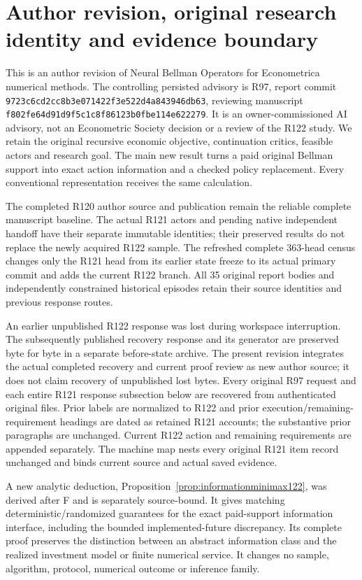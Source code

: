 \section*{Author revision, original research identity and evidence boundary}
This is an author revision of Neural Bellman Operators for Econometrica numerical methods. The controlling persisted advisory is R97, report commit \nolinkurl{9723c6cd2cc8b3e071422f3e522d4a843946db63}, reviewing manuscript \nolinkurl{f802fe64d91d9f5c1c8f86123b0fbe114e622279}. It is an owner-commissioned AI advisory, not an Econometric Society decision or a review of the R122 study. We retain the original recursive economic objective, continuation critics, feasible actors and research goal. The main new result turns a paid original Bellman support into exact action information and a checked policy replacement. Every conventional representation receives the same calculation.

The completed R120 author source and publication remain the reliable complete manuscript baseline. The actual R121 actors and pending native independent handoff have their separate immutable identities; their preserved results do not replace the newly acquired R122 sample. The refreshed complete 363-head census changes only the R121 head from its earlier state freeze to its actual primary commit and adds the current R122 branch. All 35 original report bodies and independently constrained historical episodes retain their source identities and previous response routes.

An earlier unpublished R122 response was lost during workspace interruption. The subsequently published recovery response and its generator are preserved byte for byte in a separate before-state archive. The present revision integrates the actual completed recovery and current proof review as new author source; it does not claim recovery of unpublished lost bytes. Every original R97 request and each entire R121 response subsection below are recovered from authenticated original files. Prior labels are normalized to R122 and prior execution/remaining-requirement headings are dated as retained R121 accounts; the substantive prior paragraphs are unchanged. Current R122 action and remaining requirements are appended separately. The machine map nests every original R121 item record unchanged and binds current source and actual saved evidence.

A new analytic deduction, Proposition~\ref{prop:informationminimax122}, was derived after F and is separately source-bound. It gives matching deterministic/randomized guarantees for the exact paid-support information interface, including the bounded implemented-future discrepancy. Its complete proof preserves the distinction between an abstract information class and the realized investment model or finite numerical service. It changes no sample, algorithm, protocol, numerical outcome or inference family.

